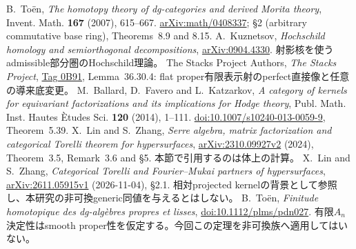 B.~To\"en, \emph{The homotopy theory of dg-categories and derived Morita theory},
Invent. Math. \textbf{167} (2007), 615--667.
\href{https://arxiv.org/abs/math/0408337}{arXiv:math/0408337};
\S2 (arbitrary commutative base ring), Theorems~8.9 and 8.15.
A.~Kuznetsov, \emph{Hochschild homology and semiorthogonal decompositions},
\href{https://arxiv.org/abs/0904.4330}{arXiv:0904.4330}.
射影核を使うadmissible部分圏のHochschild理論。
The Stacks Project Authors, \emph{The Stacks Project},
\href{https://stacks.math.columbia.edu/tag/0B91}{Tag 0B91}, Lemma~36.30.4:
flat proper有限表示射のperfect直接像と任意の導来底変更。
M.~Ballard, D.~Favero and L.~Katzarkov,
\emph{A category of kernels for equivariant factorizations and its implications for Hodge theory},
Publ. Math. Inst. Hautes \`Etudes Sci. \textbf{120} (2014), 1--111.
\href{https://doi.org/10.1007/s10240-013-0059-9}{doi:10.1007/s10240-013-0059-9}, Theorem~5.39.
X.~Lin and S.~Zhang, \emph{Serre algebra, matrix factorization and categorical Torelli theorem for hypersurfaces},
\href{https://arxiv.org/abs/2310.09927v2}{arXiv:2310.09927v2} (2024),
Theorem~3.5, Remark~3.6 and \S5. 本節で引用するのは体上の計算。
X.~Lin and S.~Zhang, \emph{Categorical Torelli and Fourier--Mukai partners of hypersurfaces},
\href{https://arxiv.org/abs/2611.05915v1}{arXiv:2611.05915v1} (2026-11-04), \S2.1.
相対projected kernelの背景として参照し、本研究の非可換generic同値を与えるとはしない。
B.~To\"en, \emph{Finitude homotopique des dg-alg\`ebres propres et lisses},
\href{https://doi.org/10.1112/plms/pdn027}{doi:10.1112/plms/pdn027}.
有限$A_n$決定性はsmooth proper性を仮定する。今回この定理を非可換族へ適用してはいない。
